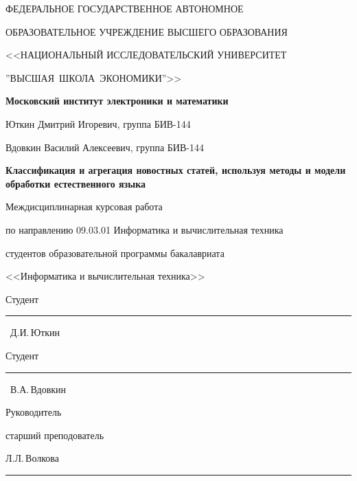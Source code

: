 \begin{titlepage}
    \begin{center}
        ФЕДЕРАЛЬНОЕ ГОСУДАРСТВЕННОЕ АВТОНОМНОЕ
        
        ОБРАЗОВАТЕЛЬНОЕ УЧРЕЖДЕНИЕ ВЫСШЕГО ОБРАЗОВАНИЯ
        
       <<НАЦИОНАЛЬНЫЙ ИССЛЕДОВАТЕЛЬСКИЙ УНИВЕРСИТЕТ
       
       ''ВЫСШАЯ~ШКОЛА~ЭКОНОМИКИ''>>
       \vspace{1cm}
 
        \textbf{Московский институт электроники и математики}
        \vspace{1cm}

        Юткин Дмитрий Игоревич, группа БИВ-144
		
		Вдовкин Василий Алексеевич, группа БИВ-144
        \vspace{1cm}
        
        \textbf{Классификация и агрегация новостных статей, используя методы и модели обработки естественного языка}
        
        \vspace{1cm}

        Междисциплинарная курсовая работа
        
        по направлению 09.03.01 Информатика и вычислительная техника 

        студентов образовательной программы бакалавриата
        
        <<Информатика и вычислительная техника>>
        
    \end{center}
    \vspace{1cm}
    \begin{flushright}
        Студент~\rule{4cm}{.1pt}~Д.И.\,Юткин
        
        Студент~\rule{4cm}{.1pt}~В.А.\,Вдовкин
        
        \vspace{1cm}
        
        Руководитель

        старший преподователь

        Л.Л.\,Волкова
        
        \rule{4cm}{.1pt}
    \end{flushright}
    \vfill{}
\end{titlepage}